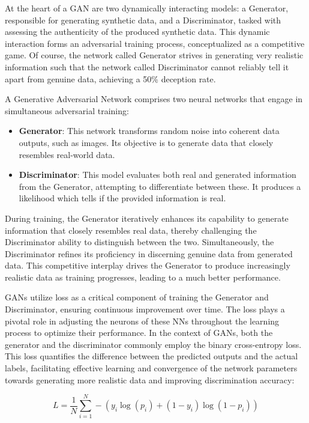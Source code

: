 \documentclass[12pt,a4paper]{report}
\begin{document}
At the heart of a GAN are two dynamically interacting models: a Generator, responsible for generating synthetic data, and a Discriminator, tasked with assessing the authenticity of the produced synthetic data. This dynamic interaction forms an adversarial training process, conceptualized as a competitive game. Of course, the network called Generator strives in generating very realistic information such that the network called Discriminator cannot reliably tell it apart from genuine data, achieving a 50\% deception rate.

A Generative Adversarial Network comprises two neural networks that engage in simultaneous adversarial training:

\begin{itemize}
  \item \textbf{Generator}: This network transforms random noise into coherent data outputs, such as images. Its objective is to generate data that closely resembles real-world data.
  \item \textbf{Discriminator}: This model evaluates both real and generated information from the Generator, attempting to differentiate between these. It produces a likelihood which tells if the provided information is real.
\end{itemize}

During training, the Generator iteratively enhances its capability to generate information that closely resembles real data, thereby challenging the Discriminator ability to distinguish between the two. Simultaneously, the Discriminator refines its proficiency in discerning genuine data from generated data. This competitive interplay drives the Generator to produce increasingly realistic data as training progresses, leading to a much better performance.

GANs utilize loss as a critical component of training the Generator and Discriminator, ensuring continuous improvement over time. The loss plays a pivotal role in adjusting the neurons of these NNs throughout the learning process to optimize their performance. In the context of GANs, both the generator and the discriminator commonly employ the binary cross-entropy loss. This loss quantifies the difference between the predicted outputs and the actual labels, facilitating effective learning and convergence of the network parameters towards generating more realistic data and improving discrimination accuracy:

\begin{equation}
  L = \frac{1}{N} \sum_{i=1}^{N} - (y_{i} \log(p_{i}) + (1 - y_{i}) \log(1 - p_{i}))
\end{equation}
\end{document}
